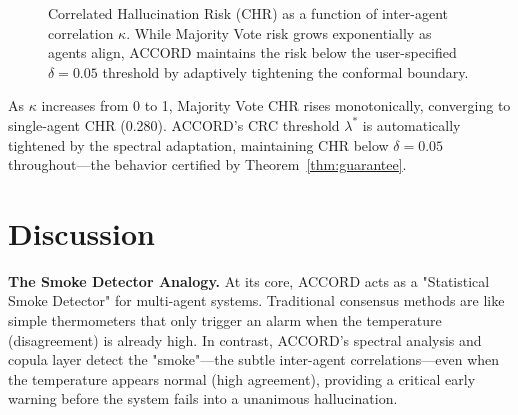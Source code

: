\documentclass[conference]{IEEEtran}
\begin{document}
\begin{figure}[t]
  \centering
  \caption{Correlated Hallucination Risk (CHR) as a function of inter-agent correlation $\kappa$. While Majority Vote risk grows exponentially as agents align, ACCORD maintains the risk below the user-specified $\delta=0.05$ threshold by adaptively tightening the conformal boundary.}
  \label{fig:kappa}
\end{figure}

As $\kappa$ increases from 0 to 1, Majority Vote CHR rises
monotonically, converging to single-agent CHR (0.280).
ACCORD's CRC threshold $\lambda^*$ is automatically tightened
by the spectral adaptation, maintaining CHR below $\delta = 0.05$
throughout—the behavior certified by Theorem~\ref{thm:guarantee}.

\section{Discussion}
\label{sec:discussion}

\textbf{The Smoke Detector Analogy.}
At its core, ACCORD acts as a "Statistical Smoke Detector" for multi-agent systems. Traditional consensus methods are like simple thermometers that only trigger an alarm when the temperature (disagreement) is already high. In contrast, ACCORD's spectral analysis and copula layer detect the "smoke"—the subtle inter-agent correlations—even when the temperature appears normal (high agreement), providing a critical early warning before the system fails into a unanimous hallucination.
\end{document}

